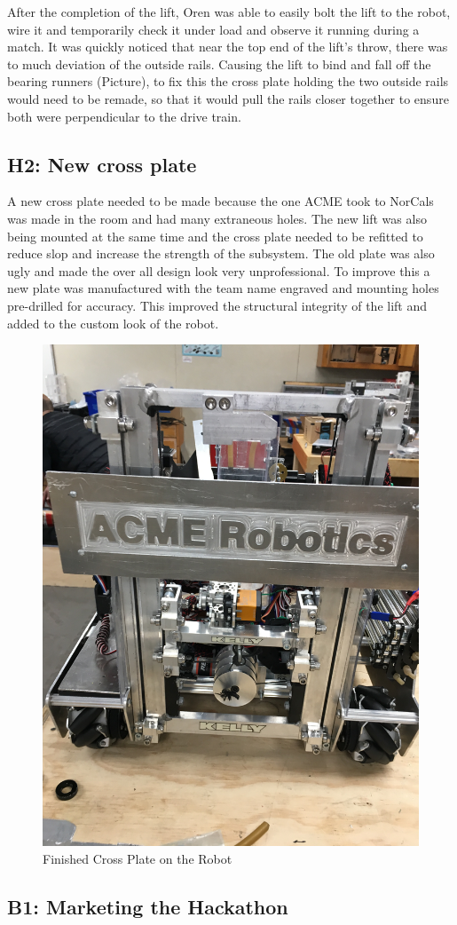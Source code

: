 \documentclass{article}
\begin{document}
After the completion of the lift, Oren was able to easily bolt the lift to the robot, wire it and temporarily check it under load and observe it running during a match. It was quickly noticed that near the top end of the lift's throw, there was to much deviation of the outside rails. Causing the lift to bind and fall off the bearing runners (Picture), to fix this the cross plate holding the two outside rails would need to be remade, so that it would pull the rails closer together to ensure both were perpendicular to the drive train. 

\subsection{H2: New cross plate}

  A new cross plate needed to be made because the one ACME took to NorCals was made in the room and had many extraneous holes. The new lift was also being mounted at the same time and the cross plate needed to be refitted to reduce slop and increase the strength of the subsystem. The old plate was also ugly and made the over all design look very unprofessional. To improve this a new plate was manufactured with the team name engraved and mounting holes pre-drilled for accuracy. This improved the structural integrity of the lift and added to the custom look of the robot.
  
  \begin{figure}
    \centering
    \includegraphics[width= 0.5 \textwidth, angle=270]{28_03-11/images/crossplate.JPG}
    \caption{Finished Cross Plate on the Robot}
    \label{fig:plate}
\end{figure}

 \subsection{B1: Marketing the Hackathon}
\end{document}
